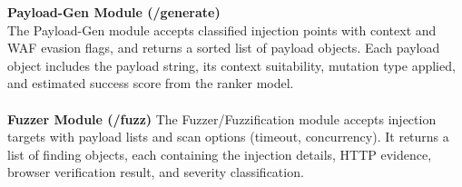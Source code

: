 \textbf{Payload-Gen Module (/generate)}\\
The Payload-Gen module accepts classified injection points with context and WAF evasion flags, and returns a sorted list of payload objects. Each payload object includes the payload string, its context suitability, mutation type applied, and estimated success score from the ranker model.
\\ \\
\textbf{Fuzzer Module (/fuzz)}
The Fuzzer/Fuzzification module accepts injection targets with payload lists and scan options (timeout, concurrency). It returns a list of finding objects, each containing the injection details, HTTP evidence, browser verification result, and severity classification.
